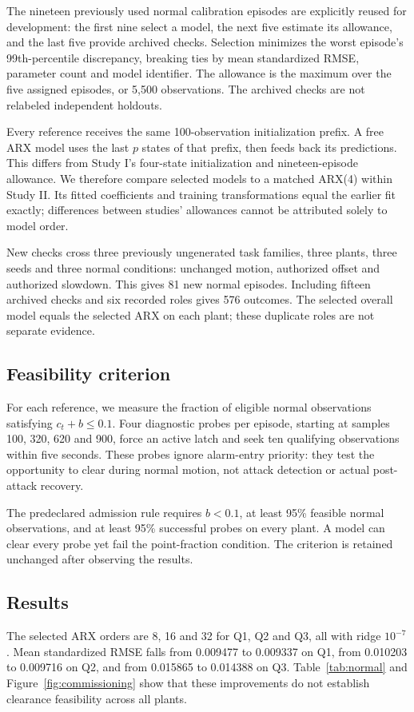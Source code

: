 \documentclass[11pt]{article}
\begin{document}
The nineteen previously used normal calibration episodes are explicitly reused for development: the first nine select a model, the next five estimate its allowance, and the last five provide archived checks. Selection minimizes the worst episode's 99th-percentile discrepancy, breaking ties by mean standardized RMSE, parameter count and model identifier. The allowance is the maximum over the five assigned episodes, or 5,500 observations. The archived checks are not relabeled independent holdouts.

Every reference receives the same 100-observation initialization prefix. A free ARX model uses the last $p$ states of that prefix, then feeds back its predictions. This differs from Study I's four-state initialization and nineteen-episode allowance. We therefore compare selected models to a matched ARX(4) within Study II. Its fitted coefficients and training transformations equal the earlier fit exactly; differences between studies' allowances cannot be attributed solely to model order.

New checks cross three previously ungenerated task families, three plants, three seeds and three normal conditions: unchanged motion, authorized offset and authorized slowdown. This gives 81 new normal episodes. Including fifteen archived checks and six recorded roles gives 576 outcomes. The selected overall model equals the selected ARX on each plant; these duplicate roles are not separate evidence.

\subsection{Feasibility criterion}
For each reference, we measure the fraction of eligible normal observations satisfying $c_t+b\le0.1$. Four diagnostic probes per episode, starting at samples 100, 320, 620 and 900, force an active latch and seek ten qualifying observations within five seconds. These probes ignore alarm-entry priority: they test the opportunity to clear during normal motion, not attack detection or actual post-attack recovery.

The predeclared admission rule requires $b<0.1$, at least 95\% feasible normal observations, and at least 95\% successful probes on every plant. A model can clear every probe yet fail the point-fraction condition. The criterion is retained unchanged after observing the results.

\subsection{Results}
The selected ARX orders are 8, 16 and 32 for Q1, Q2 and Q3, all with ridge $10^{-7}$. Mean standardized RMSE falls from 0.009477 to 0.009337 on Q1, from 0.010203 to 0.009716 on Q2, and from 0.015865 to 0.014388 on Q3. Table~\ref{tab:normal} and Figure~\ref{fig:commissioning} show that these improvements do not establish clearance feasibility across all plants.
\end{document}

